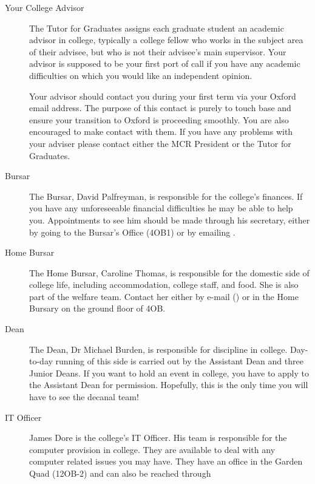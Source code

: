 \begin{description}
\item[Your College Advisor]
The Tutor for Graduates assigns each graduate student an academic advisor in college, typically a college fellow who works in the subject area of their advisee, but who is not their advisee's main supervisor. Your advisor is supposed to be your first port of call if you have any academic difficulties on which you would like an independent opinion.

Your advisor should contact you during your first term via your Oxford email address. The purpose of this contact is purely to touch base and ensure your transition to Oxford is proceeding smoothly. You are also encouraged to make contact with them. If you have any problems with your adviser please contact either the MCR President or the Tutor for Graduates.

\item[Bursar]
The Bursar, David Palfreyman, is responsible for the college's finances. If you have any unforeseeable financial difficulties he may be able to help you. Appointments to see him should be made through his secretary, either by going to the Bursar's Office (4OB1) or by emailing \href{mailto:bursar@new.ox.ac.uk}{}.

\item[Home Bursar]
The Home Bursar, Caroline Thomas, is responsible for the domestic side of college life, including accommodation, college staff, and food. She is also part of the welfare team. Contact her either by e-mail (\href{mailto:caroline.thomes@new.ox.ac.uk}{}) or in the Home Bursary on the ground floor of 4OB.

\item[Dean]
The Dean, Dr Michael Burden, is responsible for discipline in college. Day-to-day running of this side is carried out by the Assistant Dean and three Junior Deans. If you want to hold an event in college, you have to apply to the Assistant Dean for permission. Hopefully, this is the only time you will have to see the decanal team!

\item[IT Officer]
James Dore is the college's IT Officer. His team is responsible for the computer provision in college. They are available to deal with any computer related issues you may have. They have an office in the Garden Quad (12OB-2) and can also be reached through
\href{mailto:it-support@new.ox.ac.uk}{}


\end{description}
